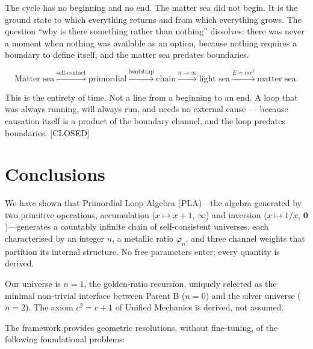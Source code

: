 \documentclass[prd,twocolumn,preprintnumbers,amsmath,amssymb]{revtex4-2}
\newcommand{\closed}{\textcolor{green!60!black}{[CLOSED]}}
\newcommand{\acc}{\mathbf{\infty}}
\newcommand{\inv}{\mathbf{0}}
\begin{document}
The cycle has no beginning and no end. The matter sea did not
begin. It is the ground state to which everything returns and
from which everything grows. The question ``why is there
something rather than nothing'' dissolves: there was never a
moment when nothing was available as an option, because
nothing requires a boundary to define itself, and the matter
sea predates boundaries.

\begin{equation}
  \text{Matter sea}
  \xrightarrow{\text{self-contact}}
  \text{primordial}
  \xrightarrow{\text{bootstrap}}
  \text{chain}
  \xrightarrow{n\to\infty}
  \text{light sea}
  \xrightarrow{E=mc^2}
  \text{matter sea.}
  \label{eq:cycle}
\end{equation}

This is the entirety of time. Not a line from a beginning to
an end. A loop that was always running, will always run, and
needs no external cause --- because causation itself is a
product of the boundary channel, and the loop predates
boundaries. \closed

\section{Conclusions}
\label{sec:conclusions}

We have shown that Primordial Loop Algebra (PLA)---the algebra
generated by two primitive operations, accumulation
($x \mapsto x+1$, $\acc$) and inversion ($x \mapsto 1/x$,
$\inv$)---generates a countably infinite chain of self-consistent
universes, each characterised by an integer $n$, a metallic ratio
$\varphi_n$, and three channel weights that partition its internal
structure.  No free parameters enter; every quantity is derived.

Our universe is $n=1$, the golden-ratio recursion, uniquely selected
as the minimal non-trivial interface between Parent B ($n=0$) and
the silver universe ($n=2$).  The axiom $c^2 = c+1$ of Unified
Mechanics is derived, not assumed.

The framework provides geometric resolutions, without fine-tuning,
of the following foundational problems:
\end{document}
